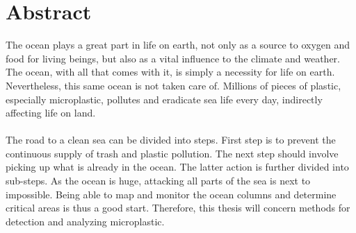 \chapter*{Abstract}

The ocean plays a great part in life on earth, not only as a source to oxygen and food for living beings, but also as a vital influence to the climate and weather. The ocean, with all that comes with it, is simply a necessity for life on earth. Nevertheless, this same ocean is not taken care of. Millions of pieces of plastic, especially microplastic, pollutes and eradicate sea life every day, indirectly affecting life on land. 
\\\\
The road to a clean sea can be divided into steps. First step is to prevent the continuous supply of trash and plastic pollution. The next step should involve picking up what is already in the ocean. The latter action is further divided into sub-steps. As the ocean is huge, attacking all parts of the sea is next to impossible. Being able to map and monitor the ocean columns and determine critical areas is thus a good start. Therefore, this thesis will concern methods for detection and analyzing microplastic. 


\hypersetup{pageanchor=false}